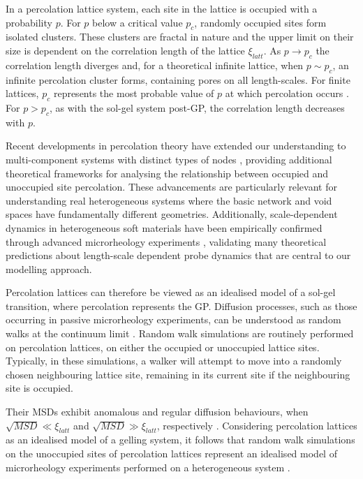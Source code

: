 \documentclass[%
 aip,
 amsmath,amssymb,
reprint, onecolumn %
]{revtex4-1}
\begin{document}
In a percolation lattice system, each site in the lattice is occupied with a probability $p$. For $p$ below a critical value $p_{c}$, randomly occupied sites form isolated clusters. These clusters are fractal in nature and the upper limit on their size is dependent on the correlation length of the lattice $\xi_{latt}$. As $p \rightarrow p_{c}$ the correlation length diverges and, for a theoretical infinite lattice, when $p\sim p_{c}$, an infinite percolation cluster forms, containing pores on all length-scales. For finite lattices, $p_{c}$ represents the most probable value of $p$ at which percolation occurs \cite{Stauffer1992,Stauffer2007}. For $p > p_{c}$, as with the sol-gel system post-GP, the correlation length decreases with $p$.

Recent developments in percolation theory have extended our understanding to multi-component systems with distinct types of nodes \cite{Grimaldi2019}, providing additional theoretical frameworks for analysing the relationship between occupied and unoccupied site percolation. These advancements are particularly relevant for understanding real heterogeneous systems where the basic network and void spaces have fundamentally different geometries. Additionally, scale-dependent dynamics in heterogeneous soft materials have been empirically confirmed through advanced microrheology experiments \cite{Lindner2021}, validating many theoretical predictions about length-scale dependent probe dynamics that are central to our modelling approach.

Percolation lattices can therefore be viewed as an idealised model of a sol-gel transition, where percolation represents the GP. Diffusion processes, such as those occurring in passive microrheology experiments, can be understood as random walks at the continuum limit \cite{deBruyn2013}. Random walk simulations are routinely performed on percolation lattices, on either the occupied \cite{Ben-Avraham2000,Havlin1983} or unoccupied \cite{Saxton1994,Saxton1993,Saxton1997} lattice sites. Typically, in these simulations, a walker will attempt to move into a randomly chosen neighbouring lattice site, remaining in its current site if the neighbouring site is occupied.

Their MSDs exhibit anomalous and regular diffusion behaviours, when $\sqrt{MSD} \ll \xi_{latt}$ and $\sqrt{MSD} \gg \xi_{latt}$, respectively \cite{Stauffer1992,Stauffer2007}. Considering percolation lattices as an idealised model of a gelling system, it follows that random walk simulations on the unoccupied sites of percolation lattices represent an idealised model of microrheology experiments performed on a heterogeneous system \cite{deBruyn2013}.
\end{document}
